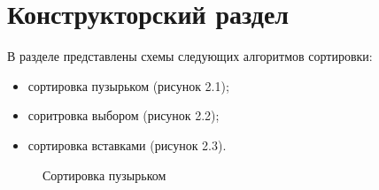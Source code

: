 \chapter{Конструкторский раздел}
В разделе представлены схемы следующих алгоритмов сортировки:
\begin{itemize}
	\item сортировка пузырьком (рисунок 2.1);
	\item соритровка выбором (рисунок 2.2);
	\item сортировка вставками (рисунок 2.3).
\end{itemize}

\begin{figure}
	\caption{Сортировка пузырьком}
\end{figure}

